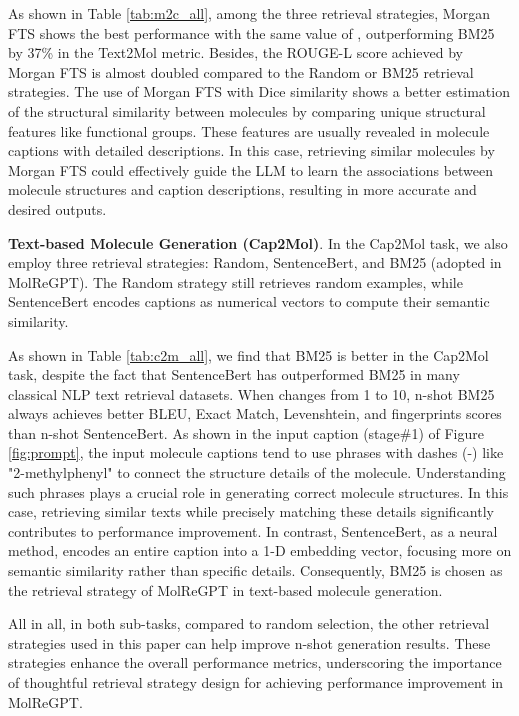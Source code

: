 \documentclass{article}
\theoremstyle{plain}
\theoremstyle{definition}
\theoremstyle{remark}
\begin{document}
As shown in Table \ref{tab:m2c_all}, among the three retrieval strategies, Morgan FTS shows the best performance with the same value of , outperforming BM25 by 37\% in the Text2Mol metric. Besides, the ROUGE-L score achieved by Morgan FTS is almost doubled compared to the Random or BM25 retrieval strategies. 
The use of Morgan FTS with Dice similarity shows a better estimation of the structural similarity between molecules by comparing unique structural features like functional groups. These features are usually revealed in molecule captions with detailed descriptions. In this case, retrieving similar molecules by Morgan FTS could effectively guide the LLM to learn the associations between molecule structures and caption descriptions, resulting in more accurate and desired outputs.

\textbf{Text-based Molecule Generation (Cap2Mol)}. 
In the Cap2Mol task, we also employ three retrieval strategies: Random, SentenceBert, and BM25 (adopted in MolReGPT). The Random strategy still retrieves  random examples, while SentenceBert encodes captions as numerical vectors to compute their semantic similarity.

As shown in Table \ref{tab:c2m_all}, we find that BM25 is better in the Cap2Mol task, despite the fact that SentenceBert has outperformed BM25 in many classical NLP text retrieval datasets. 
When  changes from 1 to 10, n-shot BM25 always achieves better BLEU, Exact Match, Levenshtein, and fingerprints scores than n-shot SentenceBert.
As shown in the input caption (stage\#1) of Figure \ref{fig:prompt}, the input molecule captions tend to use phrases with dashes (-) like "2-methylphenyl" to connect the structure details of the molecule. 
Understanding such phrases plays a crucial role in generating correct molecule structures. 
In this case, retrieving similar texts while precisely matching these details significantly contributes to performance improvement. In contrast, SentenceBert, as a neural method, encodes an entire caption into a 1-D embedding vector, focusing more on semantic similarity rather than specific details.
Consequently, BM25 is chosen as the retrieval strategy of MolReGPT in text-based molecule generation.

All in all, in both sub-tasks, compared to random selection, the other retrieval strategies used in this paper can help improve n-shot generation results. 
These strategies enhance the overall performance metrics, underscoring the importance of thoughtful retrieval strategy design for achieving performance improvement in MolReGPT.
\end{document}
